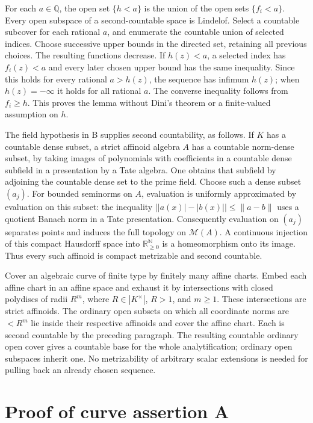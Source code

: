 \documentclass[
  11pt,
]{article}
\begin{document}
For each \(a\in\mathbb Q\), the open set \(\{h<a\}\) is the union of the
open sets \(\{f_i<a\}\). Every open subspace of a second-countable space
is Lindelof. Select a countable subcover for each rational \(a\), and
enumerate the countable union of selected indices. Choose successive
upper bounds in the directed set, retaining all previous choices. The
resulting functions decrease. If \(h(z)<a\), a selected index has
\(f_i(z)<a\) and every later chosen upper bound has the same inequality.
Since this holds for every rational \(a>h(z)\), the sequence has infimum
\(h(z)\); when \(h(z)=-\infty\) it holds for all rational \(a\). The
converse inequality follows from \(f_i\ge h\). This proves the lemma
without Dini's theorem or a finite-valued assumption on \(h\).

The field hypothesis in B supplies second countability, as follows. If
\(K\) has a countable dense subset, a strict affinoid algebra \(A\) has
a countable norm-dense subset, by taking images of polynomials with
coefficients in a countable dense subfield in a presentation by a Tate
algebra. One obtains that subfield by adjoining the countable dense set
to the prime field. Choose such a dense subset \((a_j)\). For bounded
seminorms on \(A\), evaluation is uniformly approximated by evaluation
on this subset: the inequality \(\big||a(x)|-|b(x)|\big|\le\|a-b\|\)
uses a quotient Banach norm in a Tate presentation. Consequently
evaluation on \((a_j)\) separates points and induces the full topology
on \(\mathcal M(A)\). A continuous injection of this compact Hausdorff
space into \(\mathbb R_{\ge0}^{\mathbb N}\) is a homeomorphism onto its
image. Thus every such affinoid is compact metrizable and second
countable.

Cover an algebraic curve of finite type by finitely many affine charts.
Embed each affine chart in an affine space and exhaust it by
intersections with closed polydiscs of radii \(R^m\), where
\(R\in|K^\times|\), \(R>1\), and \(m\ge1\). These intersections are
strict affinoids. The ordinary open subsets on which all coordinate
norms are \(<R^m\) lie inside their respective affinoids and cover the
affine chart. Each is second countable by the preceding paragraph. The
resulting countable ordinary open cover gives a countable base for the
whole analytification; ordinary open subspaces inherit one. No
metrizability of arbitrary scalar extensions is needed for pulling back
an already chosen sequence.

\section{Proof of curve assertion A}\label{proof-of-curve-assertion-a}
\end{document}
